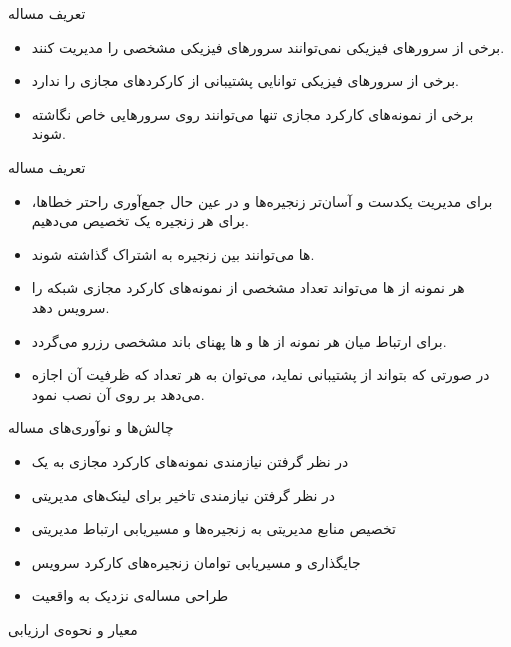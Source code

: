 \documentclass{beamer}
\makeatletter
\newcommand{\RTList}{\raggedleft\rightskip\@totalleftmargin}
\makeatother
\begin{document}
\begin{persian}
\begin{frame}{تعریف مساله}
\begin{itemize}
        \item برخی از سرور‌های فیزیکی نمی‌توانند سرور‌های فیزیکی مشخصی را مدیریت کنند.
        \item برخی از سرورهای فیزیکی توانایی پشتیبانی از کارکردهای مجازی را ندارد.
        \item برخی از نمونه‌های کارکرد مجازی تنها می‌توانند روی سرورهایی خاص نگاشته شوند.
    \end{itemize}
\end{frame}
\begin{frame}{تعریف مساله}
    \justifying
    \begin{itemize}\RTList{}
        \item برای مدیریت یکدست و آسان‌تر زنجیره‌ها و در عین حال جمع‌آوری راحتر خطاها، برای هر زنجیره یک  تخصیص می‌دهیم.
        \item {}ها می‌توانند بین زنجیره به اشتراک گذاشته شوند.
        \item هر نمونه از ها می‌تواند تعداد مشخصی از نمونه‌های کارکرد مجازی شبکه را سرویس دهد. 
        \item برای ارتباط میان هر نمونه از ها و ها پهنای باند مشخصی رزرو می‌گردد.
        \item در صورتی که  بتواند از  پشتیبانی نماید،
        می‌توان به هر تعداد که ظرفیت آن اجازه می‌دهد بر روی آن  نصب نمود.
    \end{itemize}
\end{frame}
\begin{frame}{چالش‌ها و نوآوری‌های مساله}
    \begin{itemize}\RTList{}
        \item در نظر گرفتن نیازمندی نمونه‌های کارکرد مجازی به یک 
        \item در نظر گرفتن نیازمندی تاخیر برای لینک‌های مدیریتی
        \item تخصیص منابع مدیریتی به زنجیره‌ها و مسیریابی ارتباط مدیریتی
        \item جایگذاری و مسیریابی توامان زنجیره‌های کارکرد سرویس
        \item طراحی مساله‌ی نزدیک به واقعیت
    \end{itemize}
\end{frame}
\begin{frame}{معیار و نحوه‌ی ارزیابی}

\end{frame}
\end{persian}
\end{document}
